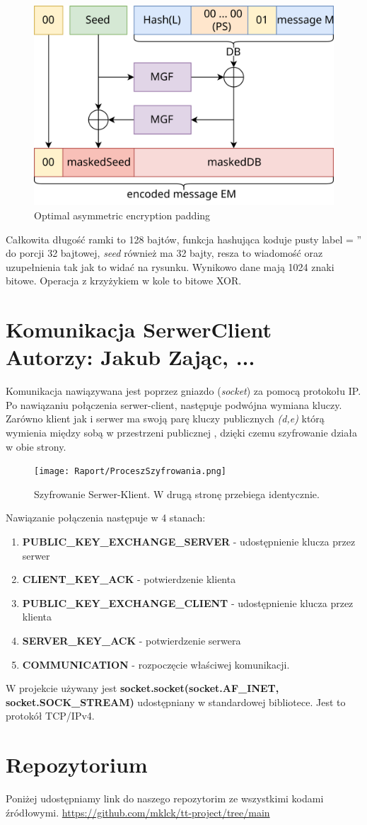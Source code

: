 \documentclass[a4paper,12pt]{article}
\begin{document}
\begin{figure}
\centerline{\includegraphics[scale=0.15]{OAEP.png}}
\caption{Optimal asymmetric encryption padding}
\end{figure}
Całkowita długość ramki to 128 bajtów, funkcja hashująca koduje pusty label = '' do porcji 32 bajtowej, \textit{seed} również ma 32 bajty, resza to wiadomość oraz uzupełnienia tak jak to widać na rysunku. Wynikowo dane mają 1024 znaki bitowe. Operacja z krzyżykiem w kole to bitowe XOR.

\section{Komunikacja SerwerClient \color{red} Autorzy: Jakub Zając, ... }
Komunikacja nawiązywana jest poprzez gniazdo (\textit{socket}) za pomocą protokołu IP. Po nawiązaniu połączenia serwer-client, następuje podwójna wymiana kluczy. Zarówno klient jak i serwer ma swoją parę kluczy publicznych \textit{(d,e)} którą wymienia między sobą w przestrzeni publicznej , dzięki czemu szyfrowanie działa w obie strony.  

\begin{figure}
\centerline{\texttt{[image: Raport/ProceszSzyfrowania.png]}}
\caption{Szyfrowanie Serwer-Klient. W drugą stronę przebiega identycznie.}
\end{figure}

Nawiązanie połączenia następuje w 4 stanach: 
\begin{enumerate}
\item \textbf{PUBLIC\_KEY\_EXCHANGE\_SERVER} - udostępnienie klucza przez serwer  \item \textbf{CLIENT\_KEY\_ACK} - potwierdzenie klienta \item \textbf{PUBLIC\_KEY\_EXCHANGE\_CLIENT} - udostępnienie klucza przez klienta  \item \textbf{SERVER\_KEY\_ACK} - potwierdzenie serwera  
\item \textbf{COMMUNICATION} - rozpoczęcie właściwej komunikacji.
\end{enumerate}
W projekcie używany jest \textbf{socket.socket(socket.AF\_INET, socket.SOCK\_STREAM)} udostępniany w standardowej bibliotece. Jest to protokół TCP/IPv4.






\section{Repozytorium}
Poniżej udostępniamy link do naszego repozytorim ze wszystkimi kodami źródłowymi.
\newline
\url{https://github.com/mklck/tt-project/tree/main}
\end{document}

